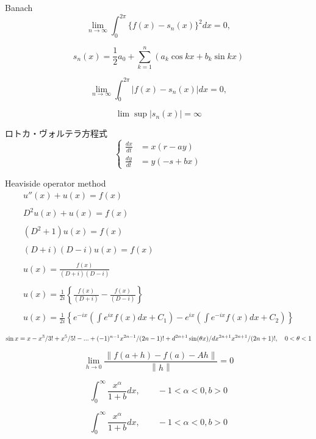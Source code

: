 Banach
$$
\lim_{n\rightarrow\infty}\int^{2\pi}_0\{f(x)-s_n(x)\}^2dx=0,
$$

$$
s_n(x)=\frac{1}{2}a_0+\sum^n_{k=1}(a_k\cos kx+b_k\sin kx)
$$

$$
\lim_{n\rightarrow\infty}\int^{2\pi}_0|f(x)-s_n(x)|dx=0,
$$

$$
\lim\sup|s_n(x)|=\infty
$$

ロトカ・ヴォルテラ方程式
$$
\left\{
\begin{array}{ll}
\frac{dx}{dt}&=x(r-ay)\\
\frac{dy}{dt}&=y(-s+bx)
\end{array}
\right.
$$


Heaviside operator method
$$
\begin{array}{l}
u''(x)+u(x)=f(x) \\
\\
D^2 u(x)+u(x)=f(x) \\
\\
(D^2+1)u(x)=f(x)\\
\\
(D+i)(D-i)u(x)=f(x) \\
\\
\displaystyle u(x)=\frac{f(x)}{(D+i)(D-i)}\\
\\
\displaystyle u(x)=\frac{1}{2i}\left\{\frac{f(x)}{(D+i)}-\frac{f(x)}{(D-i)}\right\} \\
\\
\displaystyle u(x)=\frac{1}{2i}\left\{e^{-ix}\left(\int e^{ix}f(x)dx+C_1\right)-e^{ix}\left(\int e^{-ix}f(x)dx+C_2\right)\right\}
\end{array} 
$$

$$
\sin x=x-x^3/3!+x^5/5!-...+(-1)^{n-1}x^{2n-1}/(2n-1)!+d^{2n+1}\sin (\theta x)/dx^{2n+1} x^{2n+1}/(2n+1)!,\\ \quad 0<\theta<1
$$

$$
\lim_{h\rightarrow 0}\frac{\left\|f(a+h)-f(a)-A h\right\|}{\left\|h\right\|}=0
$$

$$
\displaystyle \int^\infty_0\frac{x^\alpha}{1+b}dx,\quad \quad -1<\alpha<0,b>0
$$

$$
\displaystyle \int^\infty_0\frac{x^\alpha}{1+b}dx,\quad \quad -1<\alpha<0,b>0
$$

